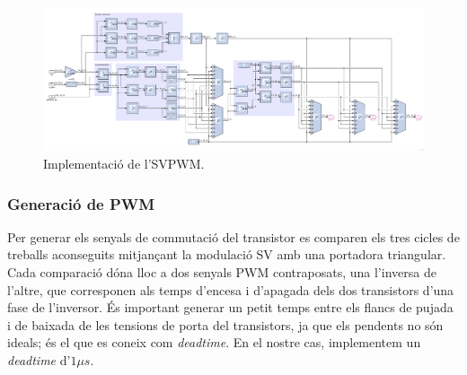 {{        \begin{figure}[!htb]
            \centering
            \captionsetup{justification=centering,margin=1.5cm}
            \includegraphics[width=16cm]
                { ../img/4_implementacio/sv.png }
            \caption{ Implementació de l'SVPWM. }
            \label{ svpwm_fpga }
        \end{figure}
    }

    \subsubsection{ Generació de PWM }
    {
        Per generar els senyals de commutació del transistor es comparen els
        tres cicles de treballs aconseguits mitjançant la modulació SV amb una
        portadora triangular. Cada comparació dóna lloc a dos senyals PWM
        contraposats, una l'inversa de l'altre, que corresponen als temps
        d'encesa i d'apagada dels dos transistors d'una fase de l'inversor. És
        important generar un petit temps entre els flancs de pujada i de
        baixada de les tensions de porta del transistors, ja que els pendents
        no són ideals; és el que es coneix com \emph{deadtime}. En el nostre
        cas, implementem un \emph{deadtime} d'$1 \mu s$.

}}
